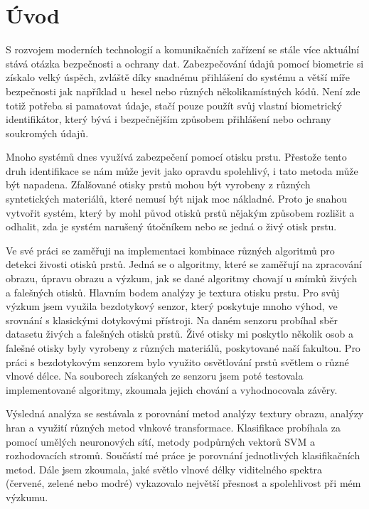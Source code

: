 \chapter{Úvod}
S rozvojem moderních technologií a komunikačních zařízení se stále více aktuální stává otázka bezpečnosti a ochrany dat. Zabezpečování údajů pomocí biometrie si získalo velký úspěch, zvláště díky snadnému přihlášení do systému a větší míře bezpečnosti jak například u~hesel nebo různých několikamístných kódů. Není zde totiž potřeba si pamatovat údaje, stačí pouze použít svůj vlastní biometrický identifikátor, který bývá i bezpečnějším způsobem přihlášení nebo ochrany soukromých údajů. 

Mnoho systémů dnes využívá zabezpečení pomocí otisku prstu. Přestože tento druh identifikace se nám může jevit jako opravdu spolehlivý, i tato metoda může být napadena. Zfalšované otisky prstů mohou být vyrobeny z různých syntetických materiálů, které nemusí být nijak moc nákladné. Proto je snahou vytvořit systém, který by mohl původ otisků prstů nějakým způsobem rozlišit a odhalit, zda je systém narušený útočníkem nebo se jedná o živý otisk prstu.

Ve své práci se zaměřuji na implementaci kombinace různých algoritmů pro detekci živosti otisků prstů. Jedná se o algoritmy, které se zaměřují na zpracování obrazu, úpravu obrazu a výzkum, jak se dané algoritmy chovají u snímků živých a falešných otisků. Hlavním bodem analýzy je textura otisku prstu. Pro svůj výzkum jsem využila bezdotykový senzor, který poskytuje mnoho výhod, ve srovnání s klasickými dotykovými přístroji. Na daném senzoru probíhal sběr datasetu živých a falešných otisků prstů. Živé otisky mi poskytlo několik osob a falešné otisky byly vyrobeny z různých materiálů, poskytované naší fakultou. Pro práci s bezdotykovým senzorem bylo využito osvětlování prstů světlem o různé vlnové délce. Na souborech získaných ze senzoru jsem poté testovala implementované algoritmy, zkoumala jejich chování a vyhodnocovala závěry.

Výsledná analýza se sestávala z porovnání metod analýzy textury obrazu, analýzy hran a využití různých metod vlnkové transformace. Klasifikace probíhala za pomocí umělých neuronových sítí, metody podpůrných vektorů SVM a rozhodovacích stromů. Součástí mé práce je porovnání jednotlivých klasifikačních metod. Dále jsem zkoumala, jaké světlo vlnové délky viditelného spektra (červené, zelené nebo modré) vykazovalo největší přesnost a spolehlivost při mém výzkumu. 

